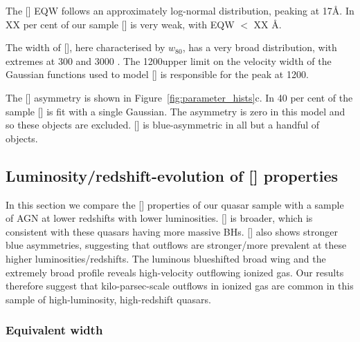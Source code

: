 The [] EQW follows an approximately log-normal distribution, peaking at 17\AA. 
In XX per cent of our sample [] is very weak, with EQW $<$ XX \AA. 

The width of [], here characterised by $w_{80}$, has a very broad distribution, with extremes at 300 and 3000 \kms. 
The 1200\kms upper limit on the velocity width of the Gaussian functions used to model [] is responsible for the peak at 1200\kms. 

The [] asymmetry is shown in Figure~\ref{fig:parameter_hists}c. 
In 40 per cent of the sample [] is fit with a single Gaussian. 
The asymmetry is zero in this model and so these objects are excluded. 
[] is blue-asymmetric in all but a handful of objects. 

\subsection{Luminosity/redshift-evolution of [] properties}

In this section we compare the [] properties of our quasar sample with a sample of AGN at lower redshifts with lower luminosities. 
[] is broader, which is consistent with these quasars having more massive BHs. 
[] also shows stronger blue asymmetries, suggesting that outflows are stronger/more prevalent at these higher luminosities/redshifts. 
The luminous blueshifted broad wing and the extremely broad profile reveals high-velocity outflowing ionized gas. 
Our results therefore suggest that kilo-parsec-scale outflows in ionized gas are common in this sample of high-luminosity, high-redshift quasars.

\subsubsection{Equivalent width}

